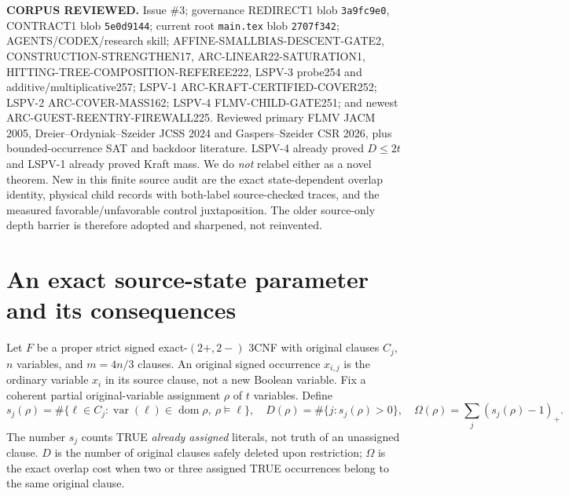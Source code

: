 \documentclass[10pt]{article}
\begin{document}
\textbf{CORPUS REVIEWED.} Issue \#3; governance REDIRECT1 blob \texttt{3a9fc9e0}, CONTRACT1 blob \texttt{5e0d9144}; current root \texttt{main.tex} blob \texttt{2707f342}; AGENTS/CODEX/research skill; AFFINE-SMALLBIAS-DESCENT-GATE2, CONSTRUCTION-STRENGTHEN17, ARC-LINEAR22-SATURATION1, HITTING-TREE-COMPOSITION-REFEREE222, LSPV-3 probe254 and additive/multiplicative257; LSPV-1 ARC-KRAFT-CERTIFIED-COVER252; LSPV-2 ARC-COVER-MASS162; LSPV-4 FLMV-CHILD-GATE251; and newest ARC-GUEST-REENTRY-FIREWALL225. Reviewed primary FLMV JACM 2005, Dreier--Ordyniak--Szeider JCSS 2024 and Gaspers--Szeider CSR 2026, plus bounded-occurrence SAT and backdoor literature. LSPV-4 already proved $D\le2t$ and LSPV-1 already proved Kraft mass. We do \emph{not} relabel either as a novel theorem. New in this finite source audit are the exact state-dependent overlap identity, physical child records with both-label source-checked traces, and the measured favorable/unfavorable control juxtaposition. The older source-only depth barrier is therefore adopted and sharpened, not reinvented.

\section{An exact source-state parameter and its consequences}
Let $F$ be a proper strict signed exact-$(2+,2-)$ 3CNF with original clauses $C_j$, $n$ variables, and $m=4n/3$ clauses. An original signed occurrence $x_{i,j}$ is the ordinary variable $x_i$ in its source clause, not a new Boolean variable. Fix a coherent partial original-variable assignment $\rho$ of $t$ variables. Define
\[
 s_j(\rho)=\#\{\ell\in C_j:\operatorname{var}(\ell)\in\operatorname{dom}\rho,\ \rho\models\ell\},\quad
 D(\rho)=\#\{j:s_j(\rho)>0\},\quad
 \Omega(\rho)=\sum_j(s_j(\rho)-1)_+.
\]
The number $s_j$ counts TRUE \emph{already assigned} literals, not truth of an unassigned clause. $D$ is the number of original clauses safely deleted upon restriction; $\Omega$ is the exact overlap cost when two or three assigned TRUE occurrences belong to the same original clause.
\end{document}
